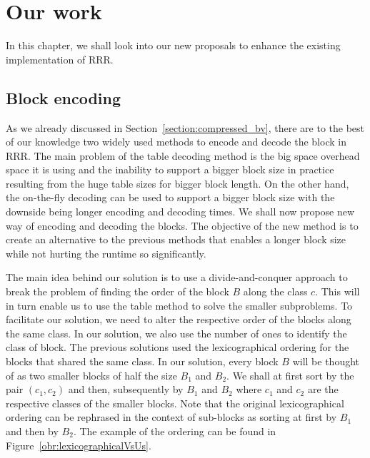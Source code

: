 \chapter{Our work}
\label{kap:kap3}

In this chapter, we shall look into our new proposals to enhance the existing implementation of RRR.

\section{Block encoding}

As we already discussed in Section~\ref{section:compressed_bv}, there are to the best of our knowledge two
widely used methods to encode and decode the block in RRR. The main problem of the table decoding method
is the big space overhead space it is using and the inability to support a bigger block size in practice resulting from the huge table
sizes for bigger block length. On the other hand, the on-the-fly decoding can be used to support a bigger
block size with the downside being longer encoding and decoding times. We shall now propose new way of
encoding and decoding the blocks. The objective of the new method is to create an alternative to the
previous methods that enables a longer block size while not hurting the runtime so significantly.

The main idea behind our solution is to use a divide-and-conquer approach to break the problem of finding the order of the block
$B$ along the class $c$. This will in turn enable us to use the table method to solve the smaller subproblems.
To facilitate our solution, we need to alter the respective order of the blocks along the same class. In our solution, we also use
the number of ones to identify the class of block. The previous solutions used the lexicographical ordering for the blocks that
shared the same class. In our solution, every block $B$ will be thought of as two smaller blocks of half the size $B_1$ and $B_2$.
We shall at first sort by the pair $(c_1, c_2)$ and then, subsequently by $B_1$ and $B_2$ where $c_1$ and $c_2$ are the respective
classes of the smaller blocks. Note that the original lexicographical ordering can be rephrased in the context of sub-blocks as
sorting at first by $B_1$ and then by $B_2$. The example of the ordering can be found in Figure~\ref{obr:lexicographicalVsUs}.


